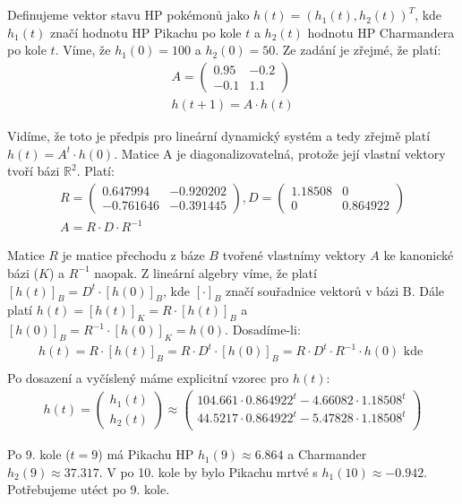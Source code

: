 \documentclass[12pt, a4paper]{article}
\begin{document}
\section{}
Definujeme vektor stavu HP pokémonů jako $h(t) = (h_1(t), h_2(t))^T$, kde $h_1(t)$ značí hodnotu HP Pikachu po kole $t$ a $h_2(t)$ hodnotu HP Charmandera po kole $t$. Víme, že $h_1(0)=100$ a $h_2(0)=50$. Ze zadání je zřejmé, že platí:
\begin{gather*}
A = \begin{pmatrix}
0.95 & -0.2\\
-0.1 & 1.1
\end{pmatrix}\\
h(t+1) = A \cdot h(t)
\end{gather*}

Vidíme, že toto je předpis pro lineární dynamický systém a tedy zřejmě platí $h(t) = A^{t}\cdot h(0)$.
Matice A je diagonalizovatelná, protože její vlastní vektory tvoří bázi $\mathbb{R}^2$. Platí:
\begin{gather*}
R = \begin{pmatrix}
0.647994 & -0.920202\\
-0.761646 & -0.391445
\end{pmatrix},
D = \begin{pmatrix}
1.18508 & 0\\
0 & 0.864922
\end{pmatrix}\\
A = R \cdot D \cdot R^{-1}
\end{gather*}

Matice $R$ je matice přechodu z báze $B$ tvořené vlastnímy vektory $A$ ke kanonické bázi ($K$) a $R^{-1}$ naopak. Z lineární algebry víme, že platí $[h(t)]_B = D^t \cdot [h(0)]_B$, kde $[\cdot]_B$ značí souřadnice vektorů v bázi B. Dále platí $h(t) = [h(t)]_K= R \cdot [h(t)]_B$ a $[h(0)]_B = R^{-1} \cdot [h(0)]_K = h(0)$. Dosadíme-li:
\begin{gather*}
h(t) = R \cdot [h(t)]_B = R \cdot D^t \cdot [h(0)]_B =  R \cdot D^t \cdot R^{-1} \cdot h(0) \text{ kde }\\
\end{gather*}
Po dosazení a vyčíslený máme explicitní vzorec pro $h(t)$:
\begin{gather*}
h(t) = \begin{pmatrix}
h_1(t)\\
h_2(t)
\end{pmatrix}\approx
\begin{pmatrix}
104.661 \cdot 0.864922^t - 4.66082 \cdot 1.18508^t\\
44.5217 \cdot 0.864922^t - 5.47828 \cdot 1.18508^t\\
\end{pmatrix}
\end{gather*}

Po 9. kole ($t=9$) má Pikachu HP $h_1(9) \approx 6.864$ a Charmander $h_2(9) \approx 37.317$. V po 10. kole by bylo Pikachu mrtvé s $h_1(10) \approx -0.942$. Potřebujeme utéct po 9. kole.
\end{document}
